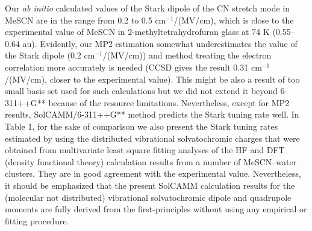 \documentclass[a4paper,titlepage,twoside,fleqn,12pt]{book}
\begin{document}
\begin{refsection}
Our \emph{ab initio} calculated values
of the Stark dipole of the CN stretch mode in MeSCN are in the range
from 0.2 to 0.5 cm$^{-1}$/(MV/cm), which is close to the
experimental value of MeSCN in 2-methyltetrahydrofuran
glass at 74 K (0.55--0.64 au).\citep{Suydam.Boxer.Biochem.2003} 
Evidently, our MP2 estimation
somewhat underestimates the value of the Stark dipole (0.2
cm$^{-1}$/(MV/cm)) and method treating the electron correlation
more accurately is needed (CCSD gives the result 0.31
cm$^{-1}$/(MV/cm), closer to the experimental value). This might be
also a result of too small basis set used for such calculations
but we did not extend it beyond 6-311++G** because of the
resource limitations. Nevertheless, except for MP2 results,
SolCAMM/6-311++G** method predicts the Stark tuning
rate well. In Table 1, for the sake of comparison we also
present the Stark tuning rates estimated by using the
distributed vibrational solvatochromic charges that were
obtained from multivariate least square fitting analyses of the
HF and DFT (density functional theory) calculation results from
a number of MeSCN--water clusters. They are in good
agreement with the experimental value. Nevertheless, it
should be emphasized that the present SolCAMM calculation
results for the (molecular not distributed) vibrational
solvatochromic dipole and quadrupole moments are fully
derived from the first\hyp{}principles without using any empirical or
fitting procedure.


\end{refsection}
\end{document}
